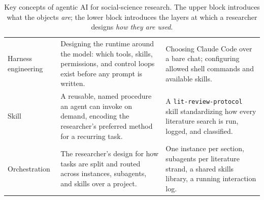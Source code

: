 \begin{table}[H]
\begin{tabularx}{\textwidth}{@{}lXX@{}}
\addlinespace
Harness engineering & Designing the runtime around the model: which tools, skills, permissions, and control loops exist before any prompt is written. & Choosing Claude Code over a bare chat; configuring allowed shell commands and available skills. \\
\addlinespace
Skill & A reusable, named procedure an agent can invoke on demand, encoding the researcher's preferred method for a recurring task. & A \texttt{lit-review-protocol} skill standardizing how every literature search is run, logged, and classified. \\
\addlinespace
Orchestration & The researcher's design for how tasks are split and routed across instances, subagents, and skills over a project. & One instance per section, subagents per literature strand, a shared skills library, a running interaction log. \\
\bottomrule
\end{tabularx}
\caption{Key concepts of agentic AI for social-science research. The upper block introduces what the objects \emph{are}; the lower block introduces the layers at which a researcher designs \emph{how they are used}.}
\label{tab:vocabulary}
\end{table}
